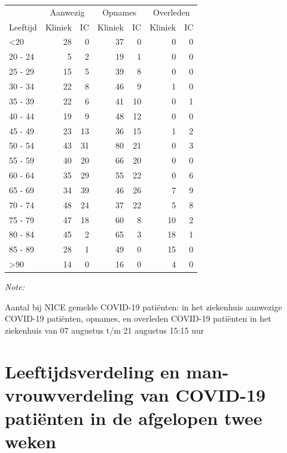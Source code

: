 \documentclass[
  english,
  man,floatsintext]{apa6}
\begin{document}
\begin{table}
\centering\begingroup\fontsize{10}{12}\selectfont

\begin{threeparttable}
\begin{tabular}{lrrrrrr}
\toprule
\multicolumn{1}{c}{ } & \multicolumn{2}{c}{Aanwezig} & \multicolumn{2}{c}{Opnames} & \multicolumn{2}{c}{Overleden} \\
\cmidrule(l{3pt}r{3pt}){2-3} \cmidrule(l{3pt}r{3pt}){4-5} \cmidrule(l{3pt}r{3pt}){6-7}
Leeftijd & Kliniek & IC & Kliniek & IC & Kliniek & IC\\
\midrule
<20 & 28 & 0 & 37 & 0 & 0 & 0\\
20 - 24 & 5 & 2 & 19 & 1 & 0 & 0\\
25 - 29 & 15 & 5 & 39 & 8 & 0 & 0\\
30 - 34 & 22 & 8 & 46 & 9 & 1 & 0\\
35 - 39 & 22 & 6 & 41 & 10 & 0 & 1\\
40 - 44 & 19 & 9 & 48 & 12 & 0 & 0\\
45 - 49 & 23 & 13 & 36 & 15 & 1 & 2\\
50 - 54 & 43 & 31 & 80 & 21 & 0 & 3\\
55 - 59 & 40 & 20 & 66 & 20 & 0 & 0\\
60 - 64 & 35 & 29 & 55 & 22 & 0 & 6\\
65 - 69 & 34 & 39 & 46 & 26 & 7 & 9\\
70 - 74 & 48 & 24 & 37 & 22 & 5 & 8\\
75 - 79 & 47 & 18 & 60 & 8 & 10 & 2\\
80 - 84 & 45 & 2 & 65 & 3 & 18 & 1\\
85 - 89 & 28 & 1 & 49 & 0 & 15 & 0\\
>90 & 14 & 0 & 16 & 0 & 4 & 0\\
\bottomrule
\end{tabular}
\begin{tablenotes}
\item \textit{Note: } 
\item Aantal bij NICE gemelde COVID-19 patiënten: in het ziekenhuis aanwezige COVID-19 patiënten, opnames, en overleden COVID-19 patiënten in het ziekenhuis van 07 augustus t/m 21 augustus 15:15 uur
\end{tablenotes}
\end{threeparttable}
\endgroup{}
\end{table}

\newpage

\hypertarget{leeftijdsverdeling-en-man-vrouwverdeling-van-covid-19-patiuxebnten-in-de-afgelopen-twee-weken}{%
\section{Leeftijdsverdeling en man-vrouwverdeling van COVID-19 patiënten in de afgelopen twee weken}\label{leeftijdsverdeling-en-man-vrouwverdeling-van-covid-19-patiuxebnten-in-de-afgelopen-twee-weken}}
\end{document}
